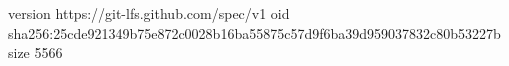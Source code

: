 version https://git-lfs.github.com/spec/v1
oid sha256:25cde921349b75e872c0028b16ba55875c57d9f6ba39d959037832c80b53227b
size 5566
